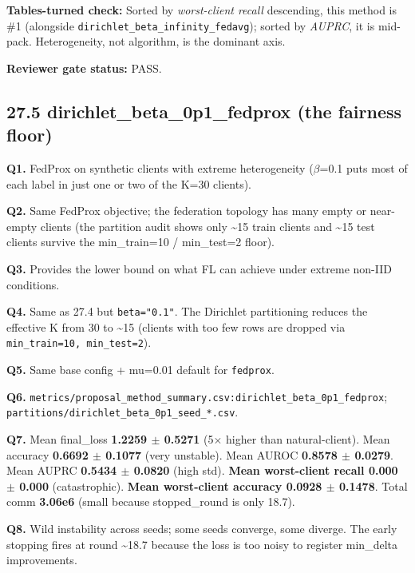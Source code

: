 \documentclass{article}
\begin{document}
\textbf{Tables-turned check:} Sorted by \emph{worst-client recall} descending, this method is \#1 (alongside \texttt{dirichlet\_beta\_infinity\_fedavg}); sorted by \emph{AUPRC}, it is mid-pack. Heterogeneity, not algorithm, is the dominant axis.


\textbf{Reviewer gate status:} PASS.


\subsection{27.5 dirichlet\_beta\_0p1\_fedprox (the fairness floor)}


\textbf{Q1.} FedProx on synthetic clients with extreme heterogeneity (\ensuremath{\beta}=0.1 puts most of each label in just one or two of the K=30 clients).


\textbf{Q2.} Same FedProx objective; the federation topology has many empty or near-empty clients (the partition audit shows only \textasciitilde{}15 train clients and \textasciitilde{}15 test clients survive the min\_train=10 / min\_test=2 floor).


\textbf{Q3.} Provides the lower bound on what FL can achieve under extreme non-IID conditions.


\textbf{Q4.} Same as 27.4 but \texttt{beta="0.1"}. The Dirichlet partitioning reduces the effective K from 30 to \textasciitilde{}15 (clients with too few rows are dropped via \texttt{min\_train=10, min\_test=2}).


\textbf{Q5.} Same base config + mu=0.01 default for \texttt{fedprox}.


\textbf{Q6.} \texttt{metrics/proposal\_method\_summary.csv:dirichlet\_beta\_0p1\_fedprox}; \texttt{partitions/dirichlet\_beta\_0p1\_seed\_*.csv}.


\textbf{Q7.} Mean final\_loss \textbf{1.2259 \ensuremath{\pm} 0.5271} (5\ensuremath{\times} higher than natural-client). Mean accuracy \textbf{0.6692 \ensuremath{\pm} 0.1077} (very unstable). Mean AUROC \textbf{0.8578 \ensuremath{\pm} 0.0279}. Mean AUPRC \textbf{0.5434 \ensuremath{\pm} 0.0820} (high std). \textbf{Mean worst-client recall 0.000 \ensuremath{\pm} 0.000} (catastrophic). \textbf{Mean worst-client accuracy 0.0928 \ensuremath{\pm} 0.1478}. Total comm \textbf{3.06e6} (small because stopped\_round is only 18.7).


\textbf{Q8.} Wild instability across seeds; some seeds converge, some diverge. The early stopping fires at round \textasciitilde{}18.7 because the loss is too noisy to register min\_delta improvements.
\end{document}
